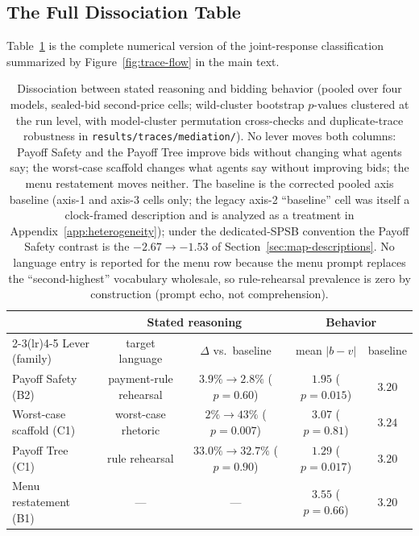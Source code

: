 \subsection{The Full Dissociation Table}\label{app:traces-dissociation}

Table~\ref{tab:trace-dissociation} is the complete numerical version of the joint-response classification summarized by Figure~\ref{fig:trace-flow} in the main text.

\begin{table}[htbp]
\centering
\small
\begin{tabular}{lcccc}
\toprule
& \multicolumn{2}{c}{Stated reasoning} & \multicolumn{2}{c}{Behavior} \\
\cmidrule(lr){2-3}\cmidrule(lr){4-5}
Lever (family) & target language & $\Delta$ vs.\ baseline &
mean $|b-v|$ & baseline \\
\midrule
Payoff Safety (B2) & payment-rule rehearsal & $3.9\%\to 2.8\%$ ($p=0.60$) &
$1.95$ ($p=0.015$) & $3.20$ \\
Worst-case scaffold (C1) & worst-case rhetoric & $2\%\to 43\%$ ($p=0.007$) &
$3.07$ ($p=0.81$) & $3.24$ \\
Payoff Tree (C1) & rule rehearsal & $33.0\%\to 32.7\%$ ($p=0.90$) &
$1.29$ ($p=0.017$) & $3.20$ \\
Menu restatement (B1) & --- & --- &
$3.55$ ($p=0.66$) & $3.20$ \\
\bottomrule
\end{tabular}
\caption{Dissociation between stated reasoning and bidding behavior (pooled over four models, sealed-bid second-price cells; wild-cluster bootstrap $p$-values clustered at the run level, with model-cluster permutation cross-checks and duplicate-trace robustness in \texttt{results/traces/mediation/}). No lever moves both columns: Payoff Safety and the Payoff Tree improve bids without changing what agents say; the worst-case scaffold changes what agents say without improving bids; the menu restatement moves neither. The baseline is the corrected pooled axis baseline (axis-1 and axis-3 cells only; the legacy axis-2 ``baseline'' cell was itself a clock-framed description and is analyzed as a treatment in Appendix~\ref{app:heterogeneity}); under the dedicated-SPSB convention the Payoff Safety contrast is the $-2.67 \to -1.53$ of Section~\ref{sec:map-descriptions}. No language entry is reported for the menu row because the menu prompt replaces the ``second-highest'' vocabulary wholesale, so rule-rehearsal prevalence is zero by construction (prompt echo, not comprehension).}
\label{tab:trace-dissociation}
\end{table}

